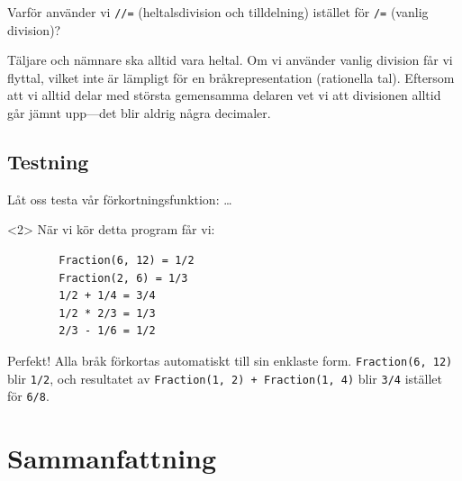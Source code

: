 \begin{exercise}
  Varför använder vi \texttt{//=} (heltalsdivision och tilldelning) 
  istället för \texttt{/=} (vanlig division)?
\end{exercise}

Täljare och nämnare ska alltid vara heltal.
Om vi använder vanlig division får vi flyttal, vilket inte är lämpligt för en 
bråkrepresentation (rationella tal).
Eftersom att vi alltid delar med största gemensamma delaren vet vi att 
divisionen alltid går jämnt upp---det blir aldrig några decimaler.

\subsection{Testning}

\begin{frame}[fragile]
  \begin{example}
    Låt oss testa vår förkortningsfunktion:
    \dots

    \begin{onlyenv}<2>
      När vi kör detta program får vi:
      \begin{verbatim}
        Fraction(6, 12) = 1/2
        Fraction(2, 6) = 1/3
        1/2 + 1/4 = 3/4
        1/2 * 2/3 = 1/3
        2/3 - 1/6 = 1/2
      \end{verbatim}
    \end{onlyenv}
  \end{example}
\end{frame}

Perfekt! Alla bråk förkortas automatiskt till sin enklaste form. 
\texttt{Fraction(6, 12)} blir \texttt{1/2}, och 
resultatet av \texttt{Fraction(1, 2) + Fraction(1, 4)} blir 
\texttt{3/4} istället för \texttt{6/8}.

\section{Sammanfattning}

